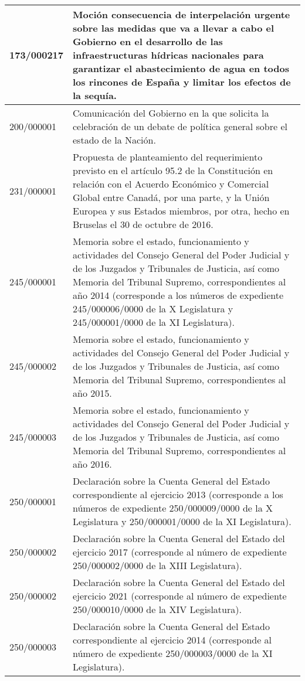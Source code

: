 {\begin{table}[H]
\begin{center}
\begin{tabularx}{\linewidth}{| l | X |}
\hline
173/000217 & Moción consecuencia de interpelación urgente sobre las medidas que va a llevar a cabo el Gobierno en el desarrollo de las infraestructuras hídricas nacionales para garantizar el abastecimiento de agua en todos los rincones de España y limitar los efectos de la sequía. \\
\hline
200/000001 & Comunicación del Gobierno en la que solicita la celebración de un debate de política general sobre el estado de la Nación. \\
\hline
231/000001 & Propuesta de planteamiento del requerimiento previsto en el artículo 95.2 de la Constitución en relación con el Acuerdo Económico y Comercial Global entre Canadá, por una parte, y la Unión Europea y sus Estados miembros, por otra, hecho en Bruselas el 30 de octubre de 2016. \\
\hline
245/000001 & Memoria sobre el estado, funcionamiento y actividades del Consejo General del Poder Judicial y de los Juzgados y Tribunales de Justicia, así como Memoria del Tribunal Supremo, correspondientes al año 2014 (corresponde a los números de expediente 245/000006/0000 de la X Legislatura y 245/000001/0000 de la XI Legislatura). \\
\hline
245/000002 & Memoria sobre el estado, funcionamiento y actividades del Consejo General del Poder Judicial y de los Juzgados y Tribunales de Justicia, así como Memoria del Tribunal Supremo, correspondientes al año 2015. \\
\hline
245/000003 & Memoria sobre el estado, funcionamiento y actividades del Consejo General del Poder Judicial y de los Juzgados y Tribunales de Justicia, así como Memoria del Tribunal Supremo, correspondientes al año 2016. \\
\hline
250/000001 & Declaración sobre la Cuenta General del Estado correspondiente al ejercicio 2013 (corresponde a los números de expediente 250/000009/0000 de la X Legislatura y 250/000001/0000 de la XI Legislatura). \\
\hline
250/000002 & Declaración sobre la Cuenta General del Estado del ejercicio 2017 (corresponde al número de expediente 250/000002/0000 de la XIII Legislatura). \\
\hline
250/000002 & Declaración sobre la Cuenta General del Estado del ejercicio 2021 (corresponde al número de expediente 250/000010/0000 de la XIV Legislatura). \\
\hline
250/000003 & Declaración sobre la Cuenta General del Estado correspondiente al ejercicio 2014 (corresponde al número de expediente 250/000003/0000 de la XI Legislatura). \\

\end{tabularx}
\end{center}
\end{table}}
